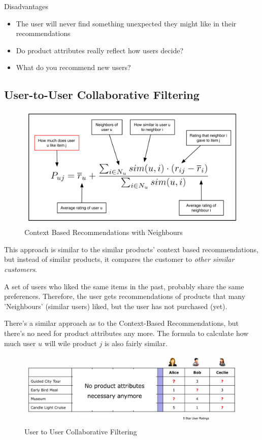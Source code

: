 \documentclass[11pt]{article}
\begin{document}
Disadvantages

\begin{itemize}
    \item The user will never find something unexpected they might like in their recommendations
    \item Do product attributes really reflect how users decide?
    \item What do you recommend new users?
\end{itemize}


\subsection{User-to-User Collaborative Filtering}

\begin{figure}
    \centering
    \includegraphics[keepaspectratio=true,height=10\baselineskip]{user_similarity.png}
    \caption{Context Based Recommendations with Neighbours}
    \label{fig:neighbours}
\end{figure}
This approach is similar to the similar products' context based recommendations, but instead of similar products, it compares the customer to \textit{other similar customers}.

A set of users who liked the same items in the past, probably share the same preferences. Therefore, the user gets recommendations of products that many 'Neighbours' (similar users) liked, but the user has not purchased (yet).


There's a similar approach as to the Context-Based Recommendations, but there's no need for product attributes any more. The formula to calculate how much user $u$ will wile product $j$ is also fairly similar.

\begin{figure}[htb!]
    \centering
    \includegraphics[keepaspectratio=true, width=\linewidth]{user_to_user_collaborative_filtering.png}
    \caption{User to User Collaborative Filtering}
    \label{fig:user_to_user_collaborative_filtering}
\end{figure}
\end{document}

